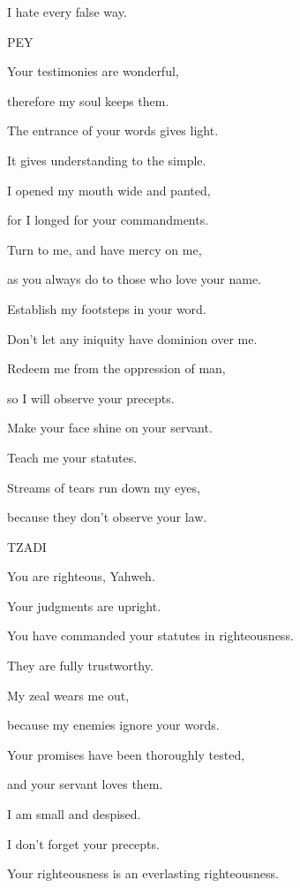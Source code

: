 {\par }{\QB I hate every false way.
\par }{\D PEY
\par }{\Q {}Your testimonies are wonderful,
\par }{\QB therefore my soul keeps them.
\par }{\Q {}The entrance of your words gives light.
\par }{\QB It gives understanding to the simple.
\par }{\Q {}I opened my mouth wide and panted,
\par }{\QB for I longed for your commandments.
\par }{\Q {}Turn to me, and have mercy on me,
\par }{\QB as you always do to those who love your name.
\par }{\Q {}Establish my footsteps in your word.
\par }{\QB Don’t let any iniquity have dominion over me.
\par }{\Q {}Redeem me from the oppression of man,
\par }{\QB so I will observe your precepts.
\par }{\Q {}Make your face shine on your servant.
\par }{\QB Teach me your statutes.
\par }{\Q {}Streams of tears run down my eyes,
\par }{\QB because they don’t observe your law.
\par }{\D TZADI
\par }{\Q {}You are righteous, Yahweh.
\par }{\QB Your judgments are upright.
\par }{\Q {}You have commanded your statutes in righteousness.
\par }{\QB They are fully trustworthy.
\par }{\Q {}My zeal wears me out,
\par }{\QB because my enemies ignore your words.
\par }{\Q {}Your promises have been thoroughly tested,
\par }{\QB and your servant loves them.
\par }{\Q {}I am small and despised.
\par }{\QB I don’t forget your precepts.
\par }{\Q {}Your righteousness is an everlasting righteousness.
}
